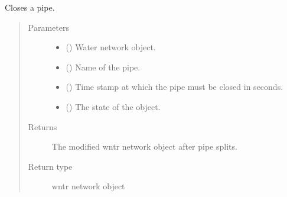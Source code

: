 \documentclass[letterpaper,10pt,english]{sphinxmanual}
\begin{document}
\begin{fulllineitems}
\label{\detokenize{apidoc:dreaminsg_integrated_model.src.network_recovery.link_close_event}}
\sphinxAtStartPar
Closes a pipe.
\begin{quote}\begin{description}
\item[{Parameters}] \leavevmode\begin{itemize}
\item {} 
\sphinxAtStartPar
{} () \textendash{} Water network object.

\item {} 
\sphinxAtStartPar
{} () \textendash{} Name of the pipe.

\item {} 
\sphinxAtStartPar
{} () \textendash{} Time stamp at which the pipe must be closed in seconds.

\item {} 
\sphinxAtStartPar
{} () \textendash{} The state of the object.

\end{itemize}

\item[{Returns}] \leavevmode
\sphinxAtStartPar
The modified wntr network object after pipe splits.

\item[{Return type}] \leavevmode
\sphinxAtStartPar
wntr network object

\end{description}\end{quote}

\end{fulllineitems}

\end{document}
